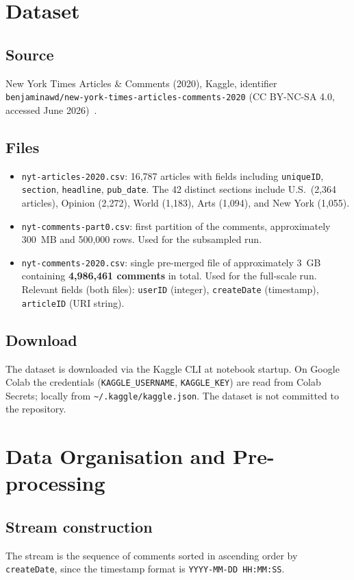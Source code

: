 \documentclass[11pt,a4paper]{article}
\begin{document}
\section{Dataset}

\subsection*{Source}
New York Times Articles \& Comments (2020), Kaggle, identifier
\texttt{benjaminawd/new-york-times-articles-comments-2020} (CC BY-NC-SA 4.0, accessed June 2026)~\cite{kaggle}.

\subsection*{Files}
\begin{itemize}
  \item \texttt{nyt-articles-2020.csv}: 16,787 articles with fields including
        \texttt{uniqueID}, \texttt{section}, \texttt{headline}, \texttt{pub\_date}.
        The 42 distinct sections include U.S.\ (2,364 articles), Opinion (2,272),
        World (1,183), Arts (1,094), and New York (1,055).
  \item \texttt{nyt-comments-part0.csv}: first partition of the comments,
        approximately 300~MB and 500,000 rows. Used for the subsampled run.
  \item \texttt{nyt-comments-2020.csv}: single pre-merged file of approximately
        3~GB containing \textbf{4,986,461 comments} in total. Used for the full-scale run.
        Relevant fields (both files): \texttt{userID} (integer), \texttt{createDate} (timestamp),
        \texttt{articleID} (URI string).
\end{itemize}

\subsection*{Download}
The dataset is downloaded via the Kaggle CLI at notebook startup.
On Google Colab the credentials (\texttt{KAGGLE\_USERNAME}, \texttt{KAGGLE\_KEY})
are read from Colab Secrets; locally from \texttt{\textasciitilde/.kaggle/kaggle.json}.
The dataset is not committed to the repository.

\section{Data Organisation and Pre-processing}

\subsection*{Stream construction}
The stream is the sequence of comments sorted in ascending order by \texttt{createDate}, since the timestamp format is \texttt{YYYY-MM-DD HH:MM:SS}.
\end{document}
